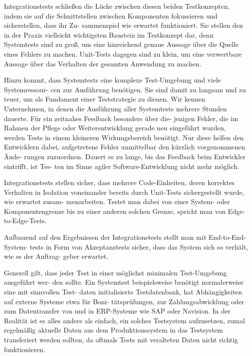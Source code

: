 Integrationstests schließen die Lücke zwischen diesen beiden Testkonzepten, indem sie
auf die Schnittstellen zwischen Komponenten fokussieren und sicherstellen, dass ihr Zu-
sammenspiel wie erwartet funktioniert. Sie stellen den in der Praxis vielleicht wichtigsten
Baustein im Testkonzept dar, denn Systemtests sind zu groß, um eine hinreichend genaue
Aussage über die Quelle eines Fehlers zu machen. Unit-Tests dagegen sind zu klein, um
eine verwertbare Aussage über das Verhalten der gesamten Anwendung zu machen.

Hinzu kommt, dass Systemtests eine komplexe Test-Umgebung und viele Systemressour-
cen zur Ausführung benötigen. Sie sind damit zu langsam und zu teuer, um als Fundament
einer Teststrategie zu dienen. Wir kennen Unternehmen, in denen die Ausführung aller
Systemtests mehrere Stunden dauerte. Für ein zeitnahes Feedback besonders über die-
jenigen Fehler, die im Rahmen der Pflege oder Weiterentwicklung gerade neu eingeführt
wurden, werden Tests in einem kleineren Wirkungsbereich benötigt. Nur diese helfen den
Entwicklern dabei, aufgetretene Fehler unmittelbar den kürzlich vorgenommenen Ände-
rungen zuzuordnen. Dauert es zu lange, bis das Feedback beim Entwickler eintrifft, ist Tes-
ten im Sinne agiler Software-Entwicklung nicht mehr möglich.

Integrationstests stellen sicher, dass mehrere Code-Einheiten, deren korrektes Verhalten in
Isolation voneinander bereits durch Unit-Tests sichergestellt wurde, wie erwartet zusam-
menarbeiten. Testet man dabei von einer System- oder Komponentengrenze bis zu einer
anderen solchen Grenze, spricht man von Edge-to-Edge-Tests.

Aufbauend auf den Ergebnissen der Integrationstests stellt man mit End-to-End-System-
tests in Form von Akzeptanztests sicher, dass das System sich so verhält, wie es der Auftrag-
geber erwartet.

Generell gilt, dass jeder Test in einer möglichst minimalen Test-Umgebung ausgeführt wer-
den sollte. Ein Systemtest beispielsweise benötigt normalerweise eine mit sinnvollen Test-
daten initialisierte Testdatenbank, hat Abhängigkeiten auf externe Systeme etwa für Boni-
tätsprüfungen, zur Zahlungsabwicklung oder zum Datentransfer von und in ERP-Systeme
wie SAP oder Navision. In der Realität ist es alles andere als einfach, ein solches Testsystem
aufzusetzen, zumal regelmäßig aktuelle Daten aus dem Produktionssystem in das Testsystem
transferiert werden sollten, da oftmals Tests mit veralteten Daten nicht richtig funktionieren.

